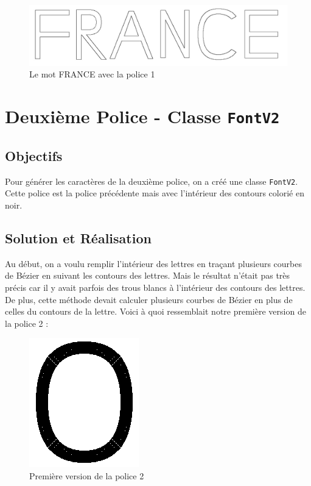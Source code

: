 \documentclass[a4paper, 12pt]{article}
\begin{document}
\begin{figure}[h]
\centering
\includegraphics[scale=0.5]{Images/FRANCE_FontV1.jpeg}
\caption{Le mot FRANCE avec la police 1}
\label{fig3}
\end{figure}

\newpage
\section{Deuxième Police - Classe \texttt{FontV2}}	
\subsection{Objectifs	}
Pour générer les caractères de la deuxième police, on a créé une classe \texttt{FontV2}. Cette police est la police précédente mais avec l'intérieur des contours colorié en noir.

\subsection{Solution et Réalisation}
Au début, on a voulu remplir l'intérieur des lettres en traçant plusieurs courbes de Bézier en suivant les contours des lettres. Mais le résultat n'était pas très précis car il y avait parfois des trous blancs à l'intérieur des contours des lettres. De plus, cette méthode devait calculer plusieurs courbes de Bézier en plus de celles du contours de la lettre. Voici à quoi ressemblait notre première version de la police 2 : 

\begin{figure}[h]
\centering
\includegraphics[scale=0.9]{Images/FontV2_O_Old.png}
\caption{Première version de la police 2}
\label{fig4}
\end{figure}
\end{document}
